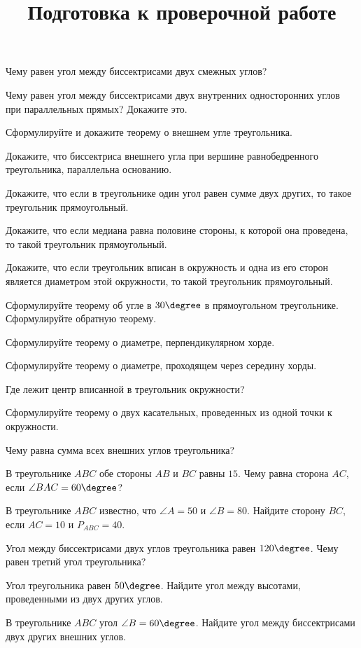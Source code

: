 \newpage
\title{Подготовка к проверочной работе}
\begin{listofex}
	\item Чему равен угол между биссектрисами двух смежных углов?
	\item Чему равен угол между биссектрисами двух внутренних односторонних углов при параллельных прямых? Докажите это.
	\item Сформулируйте и докажите теорему о внешнем угле треугольника.
	\item Докажите, что биссектриса внешнего угла при вершине равнобедренного треугольника, параллельна основанию.
	\item Докажите, что если в треугольнике один угол равен сумме двух других, то такое треугольник прямоугольный.
	\item Докажите, что если медиана равна половине стороны, к которой она проведена, то такой треугольник прямоугольный.
	\item Докажите, что если треугольник вписан в окружность и одна из его сторон является диаметром этой окружности, то такой треугольник прямоугольный.
	\item Сформулируйте теорему об угле в \( 30\degree \) в прямоугольном треугольнике. Сформулируйте обратную теорему.
	\item Сформулируйте теорему о диаметре, перпендикулярном хорде.
	\item Сформулируйте теорему о диаметре, проходящем через середину хорды.
	\item Где лежит центр вписанной в треугольник окружности?
	\item Сформулируйте теорему о двух касательных, проведенных из одной точки к окружности.
	\item Чему равна сумма всех внешних углов треугольника?
	\item {}
	\item В треугольнике \( ABC \) обе стороны \( AB \) и \( BC \) равны \( 15 \). Чему равна сторона \( AC \), если \( \angle BAC = 60 \degree \)?
	\item В треугольнике \( ABC \) известно, что \( \angle A = 50 \) и \( \angle B = 80 \). Найдите сторону \( BC \), если \( AC = 10 \) и \( P_{ABC}=40 \).
	\item Угол между биссектрисами двух углов треугольника равен \( 120\degree \). Чему равен третий угол треугольника?
	\item Угол треугольника равен \( 50\degree \). Найдите угол между высотами, проведенными из двух других углов.
	\item В треугольнике \( ABC \) угол \( \angle B=60\degree \). Найдите угол между биссектрисами двух других внешних углов.

\end{listofex}
